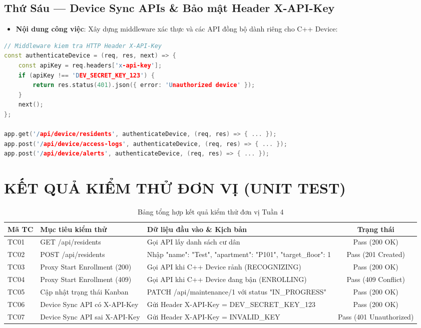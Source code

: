 \documentclass[12pt,a4paper]{article}
\begin{document}
\subsection{Thứ Sáu — Device Sync APIs \& Bảo mật Header X-API-Key}
\begin{itemize}
    \item \textbf{Nội dung công việc}: Xây dựng middleware xác thực và các API đồng bộ dành riêng cho C++ Device:
\end{itemize}

\begin{lstlisting}[language=C++]
// Middleware kiem tra HTTP Header X-API-Key
const authenticateDevice = (req, res, next) => {
    const apiKey = req.headers['x-api-key'];
    if (apiKey !== 'DEV_SECRET_KEY_123') {
        return res.status(401).json({ error: 'Unauthorized device' });
    }
    next();
};

app.get('/api/device/residents', authenticateDevice, (req, res) => { ... });
app.post('/api/device/access-logs', authenticateDevice, (req, res) => { ... });
app.post('/api/device/alerts', authenticateDevice, (req, res) => { ... });
\end{lstlisting}

\newpage

\section{KẾT QUẢ KIỂM THỬ ĐƠN VỊ (UNIT TEST)}

\begin{table}[H]
\centering
\small
\begin{tabularx}{\textwidth}{|l|X|X|c|}
\hline
\textbf{Mã TC} & \textbf{Mục tiêu kiểm thử} & \textbf{Dữ liệu đầu vào \& Kịch bản} & \textbf{Trạng thái} \\ \hline
TC01 & GET /api/residents & Gọi API lấy danh sách cư dân & Pass (200 OK) \\ \hline
TC02 & POST /api/residents & Nhập {"name": "Test", "apartment": "P101", "target_floor": 1} & Pass (201 Created) \\ \hline
TC03 & Proxy Start Enrollment (200) & Gọi API khi C++ Device rảnh (RECOGNIZING) & Pass (200 OK) \\ \hline
TC04 & Proxy Start Enrollment (409) & Gọi API khi C++ Device đang bận (ENROLLING) & Pass (409 Conflict) \\ \hline
TC05 & Cập nhật trạng thái Kanban & PATCH /api/maintenance/1 với status "IN_PROGRESS" & Pass (200 OK) \\ \hline
TC06 & Device Sync API có X-API-Key & Gửi Header X-API-Key = DEV_SECRET_KEY_123 & Pass (200 OK) \\ \hline
TC07 & Device Sync API sai X-API-Key & Gửi Header X-API-Key = INVALID_KEY & Pass (401 Unauthorized) \\ \hline
\end{tabularx}
\caption{Bảng tổng hợp kết quả kiểm thử đơn vị Tuần 4}
\end{table}
\end{document}
